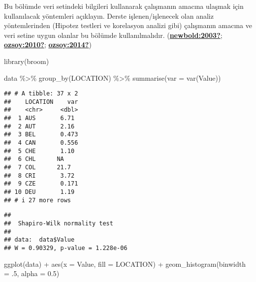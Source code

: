 \documentclass[
  12pt,
]{article}
\newenvironment{Shaded}{\begin{snugshade}}{\end{snugshade}}
\newcommand{\AttributeTok}[1]{\textcolor[rgb]{0.77,0.63,0.00}{#1}}
\newcommand{\DecValTok}[1]{\textcolor[rgb]{0.00,0.00,0.81}{#1}}
\newcommand{\FloatTok}[1]{\textcolor[rgb]{0.00,0.00,0.81}{#1}}
\newcommand{\FunctionTok}[1]{\textcolor[rgb]{0.00,0.00,0.00}{#1}}
\newcommand{\NormalTok}[1]{#1}
\newcommand{\SpecialCharTok}[1]{\textcolor[rgb]{0.00,0.00,0.00}{#1}}
\begin{document}
Bu bölümde veri setindeki bilgileri kullanarak çalışmanın amacına ulaşmak için kullanılacak yöntemleri açıklayın. Derste işlenen/işlenecek olan analiz yöntemlerinden (Hipotez testleri ve korelasyon analizi gibi) çalışmanın amacına ve veri setine uygun olanlar bu bölümde kullanılmalıdır. (\protect\hyperlink{ref-newbold:2003}{\textbf{newbold:2003?}}; \protect\hyperlink{ref-ozsoy:2010}{\textbf{ozsoy:2010?}}; \protect\hyperlink{ref-ozsoy:2014}{\textbf{ozsoy:2014?}})

\begin{Shaded}
\begin{Highlighting}[]
\FunctionTok{library}\NormalTok{(broom)}

\NormalTok{data }\SpecialCharTok{\%\textgreater{}\%} 
  \FunctionTok{group\_by}\NormalTok{(LOCATION) }\SpecialCharTok{\%\textgreater{}\%} 
  \FunctionTok{summarise}\NormalTok{(}\AttributeTok{var =} \FunctionTok{var}\NormalTok{(Value))}
\end{Highlighting}
\end{Shaded}

\begin{verbatim}
## # A tibble: 37 x 2
##    LOCATION    var
##    <chr>     <dbl>
##  1 AUS       6.71 
##  2 AUT       2.16 
##  3 BEL       0.473
##  4 CAN       0.556
##  5 CHE       1.10 
##  6 CHL      NA    
##  7 COL      21.7  
##  8 CRI       3.72 
##  9 CZE       0.171
## 10 DEU       1.19 
## # i 27 more rows
\end{verbatim}

\begin{Shaded}
\end{Shaded}

\begin{verbatim}
## 
##  Shapiro-Wilk normality test
## 
## data:  data$Value
## W = 0.90329, p-value = 1.228e-06
\end{verbatim}

\begin{Shaded}
\begin{Highlighting}[]
\FunctionTok{ggplot}\NormalTok{(data) }\SpecialCharTok{+}
  \FunctionTok{aes}\NormalTok{(}\AttributeTok{x =}\NormalTok{ Value, }\AttributeTok{fill =}\NormalTok{ LOCATION) }\SpecialCharTok{+}
  \FunctionTok{geom\_histogram}\NormalTok{(}\AttributeTok{binwidth =}\NormalTok{ .}\DecValTok{5}\NormalTok{, }\AttributeTok{alpha =} \FloatTok{0.5}\NormalTok{)}
\end{Highlighting}
\end{Shaded}
\end{document}

